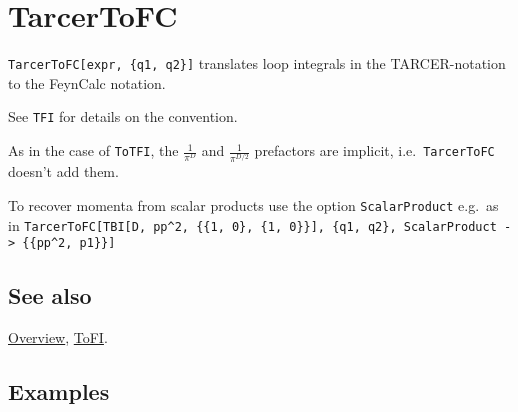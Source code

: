 \documentclass[../FeynCalcManual.tex]{subfiles}
\begin{document}
\hypertarget{tarcertofc}{%
\section{TarcerToFC}\label{tarcertofc}}

\texttt{TarcerToFC[\allowbreak{}expr,\ \allowbreak{}\{\allowbreak{}q1,\ \allowbreak{}q2\}]}
translates loop integrals in the TARCER-notation to the FeynCalc
notation.

See \texttt{TFI} for details on the convention.

As in the case of \texttt{ToTFI}, the \(\frac{1}{\pi^D}\) and
\(\frac{1}{\pi^{D/2}}\) prefactors are implicit,
i.e.~\texttt{TarcerToFC} doesn't add them.

To recover momenta from scalar products use the option
\texttt{ScalarProduct} e.g.~as in
\texttt{TarcerToFC[\allowbreak{}TBI[\allowbreak{}D,\ \allowbreak{}pp^2,\ \allowbreak{}\{\allowbreak{}\{\allowbreak{}1,\ \allowbreak{}0\},\ \allowbreak{}\{\allowbreak{}1,\ \allowbreak{}0\}\}],\ \allowbreak{}\{\allowbreak{}q1,\ \allowbreak{}q2\},\ \allowbreak{}ScalarProduct -> \{\allowbreak{}\{\allowbreak{}pp^2,\ \allowbreak{}p1\}\}]}

\subsection{See also}

\hyperlink{toc}{Overview}, \hyperlink{tofi}{ToFI}.

\subsection{Examples}

\begin{Shaded}
\begin{Highlighting}[]
\OperatorTok{[}\OperatorTok{,}\OperatorTok{[}\OperatorTok{[}\OperatorTok{,} \OperatorTok{],}\OperatorTok{[}\OperatorTok{,} \OperatorTok{]],} \OperatorTok{\{}\OperatorTok{,} \OperatorTok{,} \OperatorTok{,} \OperatorTok{,} \OperatorTok{\},} 
  \OperatorTok{\{\{}\OperatorTok{,} \OperatorTok{\},} \OperatorTok{\{}\OperatorTok{,} \OperatorTok{\},} \OperatorTok{\{}\OperatorTok{,} \OperatorTok{\},} \OperatorTok{\{}\OperatorTok{,} \OperatorTok{\},} \OperatorTok{\{}\OperatorTok{,} \OperatorTok{\}\}]}
\end{Highlighting}
\end{Shaded}
\end{document}
